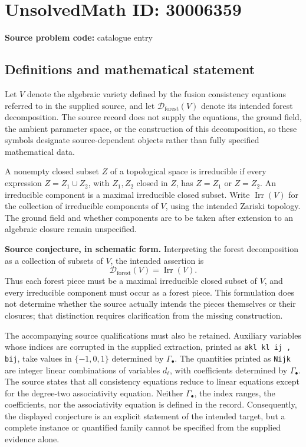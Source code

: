 \documentclass[11pt]{article}
\begin{document}
\section*{UnsolvedMath ID: 30006359}
\textbf{Source problem code:} catalogue entry
\subsection{Definitions and mathematical statement}
Let \(V\) denote the algebraic variety defined by the fusion consistency equations referred to in the supplied source, and let \(\mathcal{D}_{\mathrm{forest}}(V)\) denote its intended forest decomposition. The source record does not supply the equations, the ground field, the ambient parameter space, or the construction of this decomposition, so these symbols designate source-dependent objects rather than fully specified mathematical data.

A nonempty closed subset \(Z\) of a topological space is irreducible if every expression \(Z=Z_1\cup Z_2\), with \(Z_1,Z_2\) closed in \(Z\), has \(Z=Z_1\) or \(Z=Z_2\). An irreducible component is a maximal irreducible closed subset. Write \(\operatorname{Irr}(V)\) for the collection of irreducible components of \(V\), using the intended Zariski topology. The ground field and whether components are to be taken after extension to an algebraic closure remain unspecified.

\textbf{Source conjecture, in schematic form.} Interpreting the forest decomposition as a collection of subsets of \(V\), the intended assertion is
\[
\mathcal{D}_{\mathrm{forest}}(V)=\operatorname{Irr}(V).
\]
Thus each forest piece must be a maximal irreducible closed subset of \(V\), and every irreducible component must occur as a forest piece. This formulation does not determine whether the source actually intends the pieces themselves or their closures; that distinction requires clarification from the missing construction.

The accompanying source qualifications must also be retained. Auxiliary variables whose indices are corrupted in the supplied extraction, printed as \texttt{akl kl ij , bij}, take values in \(\{-1,0,1\}\) determined by \(\Gamma_{\bullet}\). The quantities printed as \texttt{Nijk} are integer linear combinations of variables \(d_{\ell}\), with coefficients determined by \(\Gamma_{\bullet}\). The source states that all consistency equations reduce to linear equations except for the degree-two associativity equation. Neither \(\Gamma_{\bullet}\), the index ranges, the coefficients, nor the associativity equation is defined in the record. Consequently, the displayed conjecture is an explicit statement of the intended target, but a complete instance or quantified family cannot be specified from the supplied evidence alone.
\end{document}
